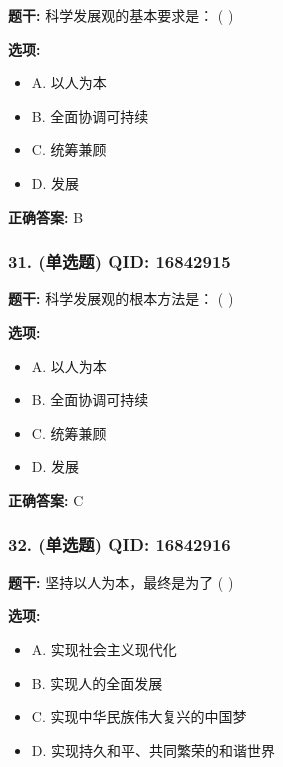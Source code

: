 \documentclass[12pt,UTF8]{ctexart}
\begin{document}
\textbf{题干:}
科学发展观的基本要求是： ( )

\textbf{选项:}
\begin{itemize}[leftmargin=*]

  \item A. 以人为本

  \item B. 全面协调可持续

  \item C. 统筹兼顾

  \item D. 发展

\end{itemize}

\textbf{正确答案:}
B

\vspace{0.3em}\hrulefill\vspace{0.7em}

\subsubsection*{31. (单选题) \small QID: 16842915}

\textbf{题干:}
科学发展观的根本方法是： ( )

\textbf{选项:}
\begin{itemize}[leftmargin=*]

  \item A. 以人为本

  \item B. 全面协调可持续

  \item C. 统筹兼顾

  \item D. 发展

\end{itemize}

\textbf{正确答案:}
C

\vspace{0.3em}\hrulefill\vspace{0.7em}

\subsubsection*{32. (单选题) \small QID: 16842916}

\textbf{题干:}
坚持以人为本，最终是为了 ( )

\textbf{选项:}
\begin{itemize}[leftmargin=*]

  \item A. 实现社会主义现代化

  \item B. 实现人的全面发展

  \item C. 实现中华民族伟大复兴的中国梦

  \item D. 实现持久和平、共同繁荣的和谐世界

\end{itemize}
\end{document}
